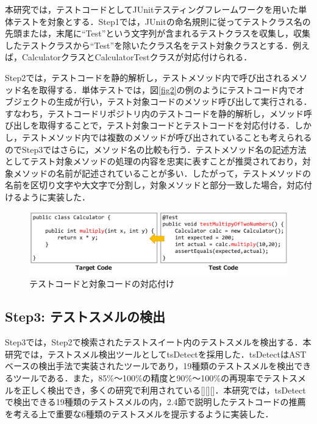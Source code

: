 \documentclass[12pt]{jarticle} %
\begin{document}
本研究では，テストコードとしてJUnitテスティングフレームワークを用いた単体テストを対象とする．Step1では，JUnitの命名規則に従ってテストクラス名の先頭または，末尾に``Test''という文字列が含まれるテストクラスを収集し，収集したテストクラスから``Test''を除いたクラス名をテスト対象クラスとする．例えば，CalculatorクラスとCalculatorTestクラスが対応付けられる．

Step2では，テストコードを静的解析し，テストメソッド内で呼び出されるメソッド名を取得する．単体テストでは，図\ref{fig2}の例のようにテストコード内でオブジェクトの生成が行い，テスト対象コードのメソッド呼び出して実行される．すなわち，テストコードリポジトリ内のテストコードを静的解析し，メソッド呼び出しを取得することで，テスト対象コードとテストコードを対応付ける．しかし，テストメソッド内では複数のメソッドが呼び出されていることも考えられるのでStep3ではさらに，メソッド名の比較も行う．テストメソッド名の記述方法としてテスト対象メソッドの処理の内容を忠実に表すことが推奨されており，対象メソッドの名前が記述されていることが多い\cite{b22}．したがって，テストメソッドの名前を区切り文字や大文字で分割し，対象メソッドと部分一致した場合，対応付けるように実装した．

\begin{figure}[htbp]
  \begin{center}
    \includegraphics[clip,width=15cm]{mapping.pdf}
    \caption{テストコードと対象コードの対応付け}
    \label{map}
  \end{center}
\end{figure}

\subsection{Step3: テストスメルの検出}

Step3では，Step2で検索されたテストスイート内のテストスメルを検出する．本研究では，テストスメル検出ツールとして{\sf tsDetect}\cite{b10}を採用した．{\sf tsDetect}はASTベースの検出手法で実装されたツールであり，19種類のテストスメルを検出できるツールである．また，85\%〜100\%の精度と90\%〜100\%の再現率でテストスメルを正しく検出でき，多くの研究で利用されている[][][]．本研究では，{\sf tsDetect}で検出できる19種類のテストスメルの内，2.4節で説明したテストコードの推薦を考える上で重要な6種類のテストスメルを提示するように実装した\cite{b9}．
\end{document}
